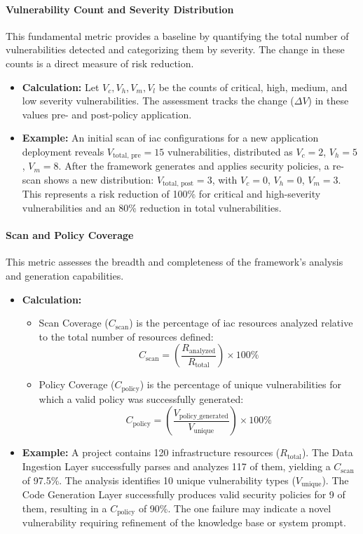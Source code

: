 \paragraph{Vulnerability Count and Severity Distribution} This fundamental metric provides a baseline by quantifying the total number of vulnerabilities detected and categorizing them by severity. The change in these counts is a direct measure of risk reduction.
\begin{itemize}
    \item \textbf{Calculation:} Let \( V_c, V_h, V_m, V_l \) be the counts of critical, high, medium, and low severity vulnerabilities. The assessment tracks the change (\( \Delta V \)) in these values pre- and post-policy application.
    \item \textbf{Example:} An initial scan of \gls{iac} configurations for a new application deployment reveals \( V_{\text{total, pre}} = 15 \) vulnerabilities, distributed as \( V_c = 2 \), \( V_h = 5 \), \( V_m = 8 \). After the framework generates and applies security policies, a re-scan shows a new distribution: \( V_{\text{total, post}} = 3 \), with \( V_c = 0 \), \( V_h = 0 \), \( V_m = 3 \). This represents a risk reduction of 100\% for critical and high-severity vulnerabilities and an 80\% reduction in total vulnerabilities.
\end{itemize}

\paragraph{Scan and Policy Coverage} This metric assesses the breadth and completeness of the framework's analysis and generation capabilities.
\begin{itemize}
    \item \textbf{Calculation:}
        \begin{itemize}
            \item Scan Coverage (\( C_{\text{scan}} \)) is the percentage of \gls{iac} resources analyzed relative to the total number of resources defined:
            \[ C_{\text{scan}} = \left(\frac{R_{\text{analyzed}}}{R_{\text{total}}}\right) \times 100\% \]
            \item Policy Coverage (\( C_{\text{policy}} \)) is the percentage of unique vulnerabilities for which a valid policy was successfully generated:
            \[ C_{\text{policy}} = \left(\frac{V_{\text{policy\_generated}}}{V_{\text{unique}}}\right) \times 100\% \]
        \end{itemize}
        \item \textbf{Example:} A project contains 120 infrastructure resources (\( R_{\text{total}} \)). The Data Ingestion Layer successfully parses and analyzes 117 of them, yielding a \( C_{\text{scan}} \) of 97.5\%. The analysis identifies 10 unique vulnerability types (\( V_{\text{unique}} \)). The Code Generation Layer successfully produces valid security policies for 9 of them, resulting in a \( C_{\text{policy}} \) of 90\%. The one failure may indicate a novel vulnerability requiring refinement of the knowledge base or system prompt.
\end{itemize}

